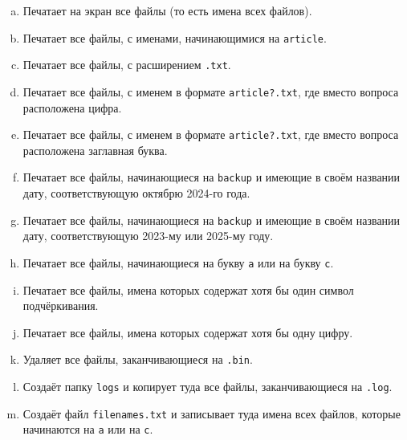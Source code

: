 \documentclass{article}
\begin{document}
\begin{enumerate}[a.]
\item Печатает на экран все файлы (то есть имена всех файлов).
\item Печатает все файлы, с именами, начинающимися на \texttt{article}.
\item Печатает все файлы, с расширением \texttt{.txt}.
\item Печатает все файлы, с именем в формате \texttt{article?.txt}, где вместо вопроса расположена цифра.
\item Печатает все файлы, с именем в формате \texttt{article?.txt}, где вместо вопроса расположена заглавная буква.
\item Печатает все файлы, начинающиеся на \texttt{backup} и имеющие в своём названии дату, соответствующую октябрю 2024-го года.
\item Печатает все файлы, начинающиеся на \texttt{backup} и имеющие в своём названии дату, соответствующую 2023-му или 2025-му году.
\item Печатает все файлы, начинающиеся на букву \texttt{a} или на букву \texttt{c}.
\item Печатает все файлы, имена которых содержат хотя бы один символ подчёркивания.
\item Печатает все файлы, имена которых содержат хотя бы одну цифру.

\item Удаляет все файлы, заканчивающиеся на \texttt{.bin}.
\item Создаёт папку \texttt{logs} и копирует туда все файлы, заканчивающиеся на \texttt{.log}.
\item Создаёт файл \texttt{filenames.txt} и записывает туда имена всех файлов, которые начинаются на \texttt{a} или на \texttt{c}.
\end{enumerate}
\end{document}
